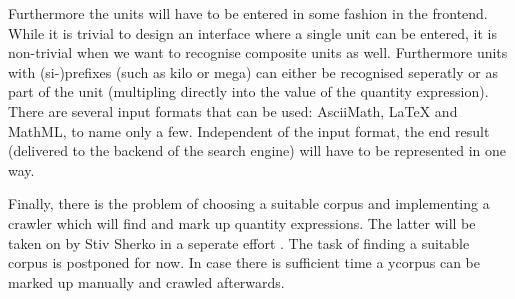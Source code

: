\documentclass[11pt]{article}
\begin{document}
Furthermore the units will have to be entered in some fashion  in the frontend. While it is trivial to design an interface where a single unit can be entered, it is non-trivial when we want to recognise composite units as well. Furthermore units with (si-)prefixes (such as kilo or mega) can either be recognised seperatly or as part of the unit (multipling directly into the value of the quantity expression). There are several input formats that can be used: AsciiMath, \LaTeX{} and MathML, to name only a few. Independent of the input format, the end result (delivered to the backend of the search engine) will have to be represented in one way.

Finally, there is the problem of choosing a suitable corpus and implementing a crawler which will find and mark up quantity expressions. The latter will be taken on by Stiv Sherko in a seperate effort \cite{proposal:sharko}. The task of finding a suitable corpus is postponed for now. In case there is sufficient time a ycorpus can be marked up manually and crawled afterwards.

{}
\end{document}
